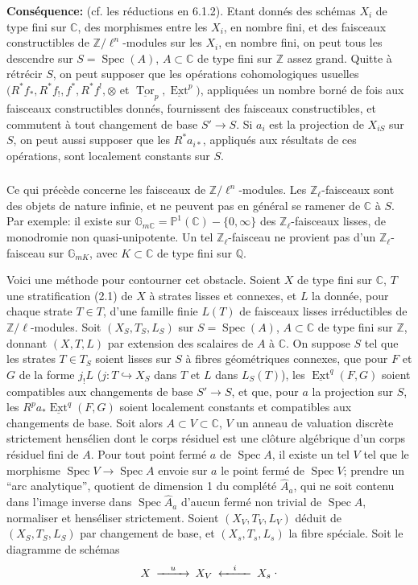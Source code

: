 \documentclass[12pt,a4paper]{article}
\theoremstyle{plain}
\theoremstyle{definition}
\theoremstyle{remark}
\DeclareMathOperator{\Ext}{Ext}
\DeclareMathOperator{\Spec}{Spec}
\DeclareMathOperator{\Tor}{Tor}
\newcommand{\CC}{\mathbb{C}}
\newcommand{\GG}{\mathbb{G}}
\newcommand{\PP}{\mathbb{P}}
\newcommand{\QQ}{\mathbb{Q}}
\newcommand{\ZZ}{\mathbb{Z}}
\begin{document}
\medskip
\noindent\textbf{Cons\'equence:} (cf. les r\'eductions en 6.1.2). Etant donn\'es des sch\'emas $X_i$ de type fini sur $\CC$, des morphismes entre les $X_i$, en nombre fini, et des faisceaux constructibles de $\ZZ/\ell^n$-modules sur les $X_i$, en nombre fini, on peut tous les descendre sur $S = \Spec(A)$, $A \subset \CC$ de type fini sur $\ZZ$ assez grand. Quitte \`a r\'etr\'ecir $S$, on peut supposer que les op\'erations cohomologiques usuelles $(R^*f_*, R^*f_!, f^*, R^*f^!, \otimes$ et $\underline{\Tor}_p, \underline{\Ext}^p)$, appliqu\'ees un nombre born\'e de fois aux faisceaux constructibles donn\'es, fournissent des faisceaux constructibles, et commutent \`a tout changement de base $S' \to S$. Si $a_i$ est la projection de $X_{iS}$ sur $S$, on peut aussi supposer que les $R^*a_{i*}$, appliqu\'es aux r\'esultats de ces op\'erations, sont localement constants sur $S$.

\subsubsection{}
Ce qui pr\'ec\`ede concerne les faisceaux de $\ZZ/\ell^n$-modules. Les $\ZZ_{\ell}$-faisceaux sont des objets de nature infinie, et ne peuvent pas en g\'en\'eral se ramener de $\CC$ \`a $S$. Par exemple: il existe sur $\GG_{m\CC} = \PP^1(\CC) - \{0, \infty\}$ des $\ZZ_{\ell}$-faisceaux lisses, de monodromie non quasi-unipotente. Un tel $\ZZ_{\ell}$-faisceau ne provient pas d'un $\ZZ_{\ell}$-faisceau sur $\GG_{mK}$, avec $K \subset \CC$ de type fini sur $\QQ$.

Voici une m\'ethode pour contourner cet obstacle. Soient $X$ de type fini sur $\CC$, $T$ une stratification (2.1) de $X$ \`a strates lisses et connexes, et $L$ la donn\'ee, pour chaque strate $T \in T$, d'une famille finie $L(T)$ de faisceaux lisses irr\'eductibles de $\ZZ/\ell$-modules. Soit $(X_S, T_S, L_S)$ sur $S = \Spec(A)$, $A \subset \CC$ de type fini sur $\ZZ$, donnant $(X, T, L)$ par extension des scalaires de $A$ \`a $\CC$. On suppose $S$ tel que les strates $T \in T_S$ soient lisses sur $S$ \`a fibres g\'eom\'etriques connexes, que pour $F$ et $G$ de la forme $j_!L$ ($j: T \hookrightarrow X_S$ dans $T$ et $L$ dans $L_S(T)$), les $\underline{\Ext}^q(F, G)$ soient compatibles aux changements de base $S' \to S$, et que, pour $a$ la projection sur $S$, les $R^pa_*\underline{\Ext}^q(F, G)$ soient localement constants et compatibles aux changements de base. Soit alors $A \subset V \subset \CC$, $V$ un anneau de valuation discr\`ete strictement hens\'elien dont le corps r\'esiduel est une cl\^oture alg\'ebrique d'un corps r\'esiduel fini de $A$. Pour tout point ferm\'e $a$ de $\Spec A$, il existe un tel $V$ tel que le morphisme $\Spec V \to \Spec A$ envoie sur $a$ le point ferm\'e de $\Spec V$; prendre un ``arc analytique'', quotient de dimension 1 du compl\'et\'e $\hat{A}_a$, qui ne soit contenu dans l'image inverse dans $\Spec \hat{A}_a$ d'aucun ferm\'e non trivial de $\Spec A$, normaliser et hens\'eliser strictement. Soient $(X_V, T_V, L_V)$ d\'eduit de $(X_S, T_S, L_S)$ par changement de base, et $(X_s, T_s, L_s)$ la fibre sp\'eciale. Soit le diagramme de sch\'emas
\[
\begin{CD}
X @>{u}>> X_V @<{i}<< X_s
\end{CD}\;.
\]
\end{document}
